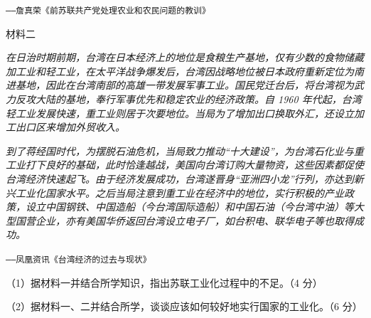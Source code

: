 \documentclass{ctexart}
\begin{document}
\begin{flushright}

\texttt{——詹真荣《前苏联共产党处理农业和农民问题的教训》}

\end{flushright}

\textsf{材料二}

\textit{在日治时期前期，台湾在日本经济上的地位是食粮生产基地，仅有少数的食物储藏加工业和轻工业，在太平洋战争爆发后，台湾因战略地位被日本政府重新定位为南进基地，因此在台湾南部的高雄一带发展军事工业。国民党迁台后，将台湾视为武力反攻大陆的基地，奉行军事优先和稳定农业的经济政策。自 1960 年代起，台湾轻工业发展快速，重工业则居于次要地位。当局为了增加出口换取外汇，还设立加工出口区来增加外贸收入。}

\textit{到了蒋经国时代，为摆脱石油危机，当局致力推动“十大建设”，为台湾石化业与重工业打下良好的基础，此时恰逢越战，美国向台湾订购大量物资，这些因素都促使台湾经济快速起飞。由于经济发展成功，台湾遂晋身“亚洲四小龙”行列，亦达到新兴工业化国家水平。之后当局注意到重工业在经济中的地位，实行积极的产业政策，设立中国钢铁、中国造船（今台湾国际造船）和中国石油（今台湾中油）等大型国营企业，亦有美国华侨返回台湾设立电子厂，如台积电、联华电子等也取得成功。}

\begin{flushright}

\texttt{——凤凰资讯《台湾经济的过去与现状》}

\end{flushright}

（1）据材料一并结合所学知识，指出苏联工业化过程中的不足。（4 分）

（2）据材料一、二并结合所学，谈谈应该如何较好地实行国家的工业化。（6 分）
\end{document}
